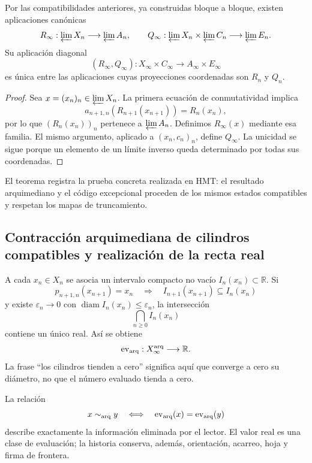 \begin{theorem}
\label{p12-83-c17-s3:thm:globalizacion-evaluaciones}
Por las compatibilidades anteriores, ya construidas bloque a bloque, existen
aplicaciones canónicas
\[
 R_\infty:\varprojlim X_n\longrightarrow\varprojlim A_n,
 \qquad
 Q_\infty:\varprojlim X_n\times\varprojlim C_n
            \longrightarrow\varprojlim E_n.
\]
Su aplicación diagonal
\[
 (R_\infty,Q_\infty):X_\infty\times C_\infty
 \longrightarrow A_\infty\times E_\infty
\]
es única entre las aplicaciones cuyas proyecciones coordenadas son
\(R_n\) y \(Q_n\).
\end{theorem}

\begin{proof}
Sea \(x=(x_n)_n\in\varprojlim X_n\). La primera ecuación de conmutatividad
implica
\[
 a_{n+1,n}(R_{n+1}(x_{n+1}))=R_n(x_n),
\]
por lo que \((R_n(x_n))_n\) pertenece a \(\varprojlim A_n\). Definimos
\(R_\infty(x)\) mediante esa familia. El mismo argumento, aplicado a
\((x_n,c_n)_n\), define \(Q_\infty\). La unicidad se sigue porque un elemento
de un límite inverso queda determinado por todas sus coordenadas.
\end{proof}

El teorema registra la prueba concreta realizada en HMT: el resultado
arquimediano y el código excepcional proceden de los mismos estados
compatibles y respetan los mapas de truncamiento.

\subsection{Contracción arquimediana de cilindros compatibles y realización de la recta real}

A cada \(x_n\in X_n\) se asocia un intervalo compacto no vacío
\(I_n(x_n)\subset\mathbb R\). Si
\[
 p_{n+1,n}(x_{n+1})=x_n
 \quad\Longrightarrow\quad
 I_{n+1}(x_{n+1})\subseteq I_n(x_n)
\]
y existe \(\varepsilon_n\to0\) con
\(\operatorname{diam}I_n(x_n)\leq\varepsilon_n\), la intersección
\[
 \bigcap_{n\geq0}I_n(x_n)
\]
contiene un único real. Así se obtiene
\[
 \operatorname{ev}_{\rm arq}:X_\infty^{\rm arq}\longrightarrow\mathbb R.
\]
La frase ``los cilindros tienden a cero'' significa aquí que converge a cero
su diámetro, no que el número evaluado tienda a cero.

La relación
\[
 x\sim_{\rm arq}y
 \quad\Longleftrightarrow\quad
 \operatorname{ev}_{\rm arq}(x)=\operatorname{ev}_{\rm arq}(y)
\]
describe exactamente la información eliminada por el lector. El valor real
es una clase de evaluación; la historia conserva, además, orientación,
acarreo, hoja y firma de frontera.

